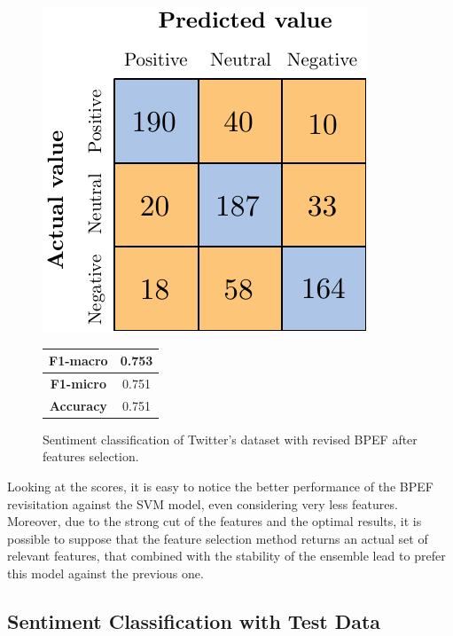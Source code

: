 \begin{figure}[H]
	\begin{minipage}[b]{0.6\linewidth}
		\centering
		\includegraphics[scale=1]{figures/conf_matrices/twitter_snt_bpef/twitter_snt_bpef_afs.pdf}
	\end{minipage}
	\begin{minipage}[b]{0.3\linewidth}
		\begin{tabular}[b]{ | c | c | } 
			\hline
			\textbf{F1-macro} & 0.753 \\
			\hline
			\textbf{F1-micro} & 0.751 \\ 
			\hline
			\textbf{Accuracy} & 0.751 \\ 
			\hline
		\end{tabular}
	\end{minipage}
	\caption{Sentiment classification of Twitter's dataset with revised BPEF after features selection.}
	\label{fig:tw_snt_bpef_afs}
\end{figure}



Looking at the scores, it is easy to notice the better performance of the BPEF revisitation against the SVM model, even considering very less features. Moreover, due to the strong cut of the features and the optimal results, it is possible to suppose that the feature selection method returns an actual set of relevant features, that combined with the stability of the ensemble lead to prefer this model against the previous one.



\subsection{Sentiment Classification with Test Data}

